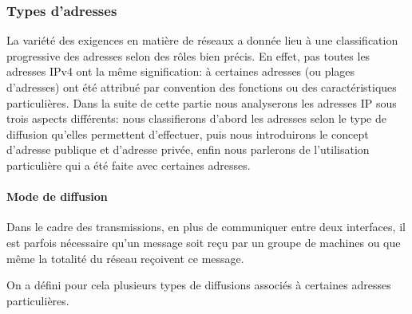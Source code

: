 \subsubsection{Types d'adresses}
La variété des exigences en matière de réseaux a donnée lieu à une
classification progressive des adresses selon des rôles bien précis. En effet,
pas toutes les adresses IPv4 ont la même signification: à certaines adresses
(ou plages d'adresses) ont été attribué par convention des fonctions ou des
caractéristiques particulières.  Dans la suite de cette partie nous analyserons les
adresses IP sous trois aspects différents: nous classifierons d'abord les adresses selon
le type de diffusion qu'elles permettent d'effectuer, puis nous introduirons le
concept d'adresse publique et d'adresse privée, enfin nous parlerons de l'utilisation
particulière qui a été faite avec certaines adresses.



\paragraph{Mode de diffusion}
Dans le cadre des transmissions, en plus de communiquer entre deux interfaces, il est 
parfois nécessaire qu'un message soit reçu par un groupe de machines ou que 
même la totalité du réseau reçoivent ce message.

On a défini pour cela plusieurs types de diffusions associés à certaines adresses particulières.

